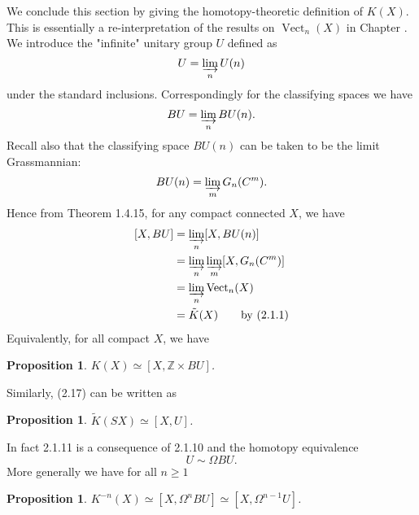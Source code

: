 \documentclass[leqno]{book}
\numberwithin{equation}{section}
\newtheorem{proposition}[theorem]{Proposition}
\theoremstyle{definition}
\begin{document}
            We conclude this section by giving the homotopy-theoretic definition of $K(X)$. This is essentially a re-interpretation of the results on $\operatorname{Vect}_{n}(X)$ in Chapter \uppercase\expandafter{}. We introduce the "infinite" unitary group $U$ defined as
            \begin{equation*}
              U=\varinjlim_{n}U(n)
            \end{equation*}
            under the standard inclusions. Correspondingly for the classifying spaces we have
            \begin{equation*}
              BU=\varinjlim_{n}BU(n).
            \end{equation*}
            Recall also that the classifying space $BU(n)$ can be taken to be the limit Grassmannian:
            \begin{equation*}
              BU(n)=\varinjlim_{m}G_{n}(C^{m}).
            \end{equation*}
            Hence from Theorem 1.4.15, for any compact connected $X$, we have
            \begin{equation*}
                \begin{aligned}
                    [X,BU]&=\varinjlim_{n}[X,BU(n)] \\
                    &= \varinjlim_{n}\varinjlim_{m}[X,G_{n}(C^{m})] \\
                    &= \varinjlim_{n} \operatorname{Vect}_{n}(X) \\
                    &= \tilde{K}(X) \qquad \text{by (2.1.1)}
                \end{aligned}
            \end{equation*}
            Equivalently, for all compact $X$, we have
            \setcounter{theorem}{9}
            \begin{proposition}
              $K(X)\simeq [X,\mathbb{Z}\times BU]$.
            \end{proposition}

            Similarly, (2.17) can be written as
            \begin{proposition}
              $\tilde{K}(SX)\simeq [X,U]$.
            \end{proposition}

            In fact 2.1.11 is a consequence of 2.1.10 and the homotopy equivalence
            \begin{equation*}
              U\sim \Omega BU.
            \end{equation*}
            More generally we have for all $n\geq 1$
            \begin{proposition}
              $K^{-n}(X)\simeq [X,\Omega^{n}BU]\simeq [X,\Omega^{n-1}U]$.
            \end{proposition}
\end{document}
